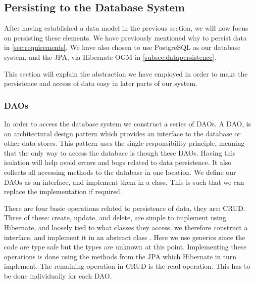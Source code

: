 \subsection{Persisting to the Database System}

After having established a data model in the previous section, we will now focus on persisting these elements.
We have previously mentioned why to persist data in \cref{sec:requirements}.
We have also chosen to use PostgreSQL as our database system, and the \ac{JPA}, via Hibernate OGM in \cref{subsec:datapersistence}.

This section will explain the abstraction we have employed in order to make the persistence and access of data easy in later parts of our system.

\subsubsection*{\acp{DAO}}
In order to access the database system we construct a series of \acp{DAO}.
A \ac{DAO}, is an architectural design pattern which provides an interface to the database or other data stores\cite{oracle_dao}.
This pattern uses the single responsibility principle, meaning that the only way to access the database is though these \acp{DAO}.
Having this isolation will help avoid errors and bugs related to data persistence.
It also collects all accessing methods to the database in one location.
We define our \acp{DAO} as an interface, and implement them in a class.
This is such that we can replace the implementation if required. 

There are four basic operations related to persistence of data, they are: \ac{CRUD}.
Three of these: create, update, and delete, are simple to implement using Hibernate, and loosely tied to what classes they access, we therefore construct a  interface, and implement it in an abstract class .
Here we use generics since the code are type safe but the types are unknown at this point.
Implementing these operations is done using the methods from the \ac{JPA} which Hibernate in turn implement.
The remaining operation in \ac{CRUD} is the read operation.
This has to be done individually for each \ac{DAO}.

